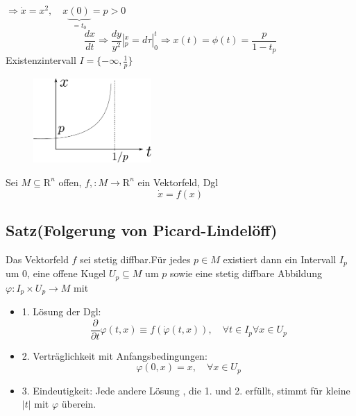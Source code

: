 \documentclass[ngerman]{tudscrreprt}
\begin{document}
$\Rightarrow \dot x = x^2 , \quad x\underbrace{(0)}_{=t_0} = p > 0$ 
\begin{equation*}
\frac{dx}{dt} \Rightarrow \frac{dy}{y^2}|_p^x = d\tau |_0^t \Rightarrow x(t) = \phi(t) = \frac{p}{1-t_p}
\end{equation*}
Existenzintervall $I = \{ -\infty, \frac{1}{p}\}$
\begin{figure}[H]
\centering
\def\svgwidth{200pt} 
  \includegraphics[width=4.5cm]{images/image17_2.pdf}
\end{figure}
Sei $M \subseteq \mathrm{R}^{n}$ offen, $f,:M \to \mathrm{R}^{n}$ ein Vektorfeld, Dgl \begin{equation*}
\dot x= f(x)
\end{equation*}
\subsection*{Satz(Folgerung von Picard-Lindelöff)}
Das Vektorfeld $f$ sei stetig diffbar.Für jedes $p \in M$ existiert dann ein Intervall $I_p$ um 0, eine offene Kugel $U_p \subseteq M$ um $p$ sowie eine stetig diffbare Abbildung $\varphi: I_p \times U_p \to M$ mit 
\begin{itemize}
\item{1.} Lösung der Dgl:
\begin{equation*}
\frac{\partial}{\partial t}\varphi(t,x) \equiv f(\dot{\varphi}(t,x)) ,\quad \forall t\in I_p \forall x \in U_p
\end{equation*}
\item{2.} Verträglichkeit mit Anfangsbedingungen:
\begin{equation*}
\varphi(0,x) = x, \quad \forall x \in U_p
\end{equation*}
\item{3.} Eindeutigkeit: Jede andere Lösung , die 1. und 2. erfüllt, stimmt für kleine $|t|$ mit $\varphi$ überein.
\end{itemize}
\end{document}
